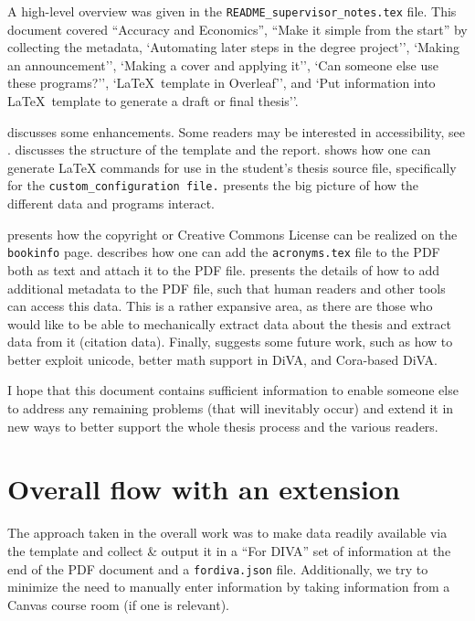 \documentclass[12pt, twoside]{article}
\begin{document}
A high-level overview was given in the \texttt{README\_supervisor\_notes.tex} file. This document covered ``Accuracy and Economics'', ``Make it simple from the start'' by collecting the metadata, 
`Automating later steps in the degree project'',
`Making an announcement'',
`Making a cover and applying it'',
`Can someone else use these programs?'',
`\LaTeX{}~template in Overleaf'', and
`Put information into \LaTeX{}~template to generate a draft or final thesis''.

 discusses some enhancements. Some readers may be interested in accessibility, see .  discusses the structure of the template and the report. 
 shows how one can generate \LaTeX{}  commands for use in the student’s thesis source file, specifically for the \texttt{custom\_configuration file.}
 presents the big picture of how the different data and programs interact.

 presents how the copyright or Creative Commons License can be realized on the \texttt{bookinfo} page.
 describes how one can add the  \texttt{acronyms.tex} file to the \gls{PDF} both as text and attach it to the \gls{PDF} file.
 presents the details of how to add additional metadata to the \gls{PDF} file, such that human readers and other tools can access this data. This is a rather expansive area, as there are those who would like to be able to mechanically extract data about the thesis and extract data from it (\eg citation data).
Finally,  suggests some future work, such as how to better exploit unicode, better math support in \gls{DiVA}, and Cora-based \gls{DiVA}.

I hope that this document contains sufficient information to enable someone else to address any remaining problems (that will inevitably occur) and extend it in new ways to better support the whole thesis process and the various readers.

\section{Overall flow with an extension}
The approach taken in the overall work was to make data readily available via the template and collect \& output it in a 
“For DIVA” set of information at the end of the \gls{PDF} document and a \texttt{fordiva.json} file. Additionally, we try to minimize the need to manually enter information by taking information from a Canvas course room (if one is relevant).
\end{document}
